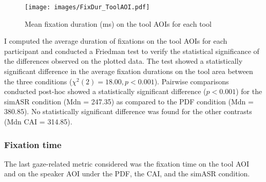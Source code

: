 \begin{figure}
\texttt{[image: images/FixDur\_ToolAOI.pdf]}
\caption[Boxplot of mean fixation duration on tool AOIs]{Mean fixation duration (ms) on the tool AOIs for each tool}
\label{fig:BPFixDurToolAOI}
\end{figure}

I computed the average duration of fixations on the tool AOIs for each participant and conducted a Friedman test to verify the statistical significance of the differences observed on the plotted data. The test showed a statistically significant difference in the average fixation durations on the tool area between the three conditions ($\chi^2(2) = 18.00, p < 0.001$). Pairwise comparisons conducted post-hoc showed a statistically significant difference ($p < 0.001$) for the simASR condition (Mdn = 247.35) as compared to the PDF condition (Mdn = 380.85). No statistically significant difference was found for the other contrasts (Mdn CAI = 314.85).

\subsubsection{Fixation time} \label{fixation_time}
The last gaze-related metric considered was the fixation time on the tool AOI and on the speaker AOI under the PDF, the CAI, and the simASR condition.

